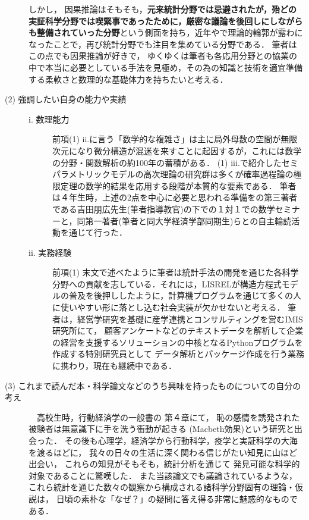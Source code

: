 \documentclass[uplatex, dvipdfmx]{jsarticle}
\begin{document}
\begin{description}
    しかし，
    因果推論はそもそも，\textbf{元来統計分野では忌避されたが，殆どの実証科学分野では喫緊事であったために，厳密な議論を後回しにしながらも整備されていった分野}という側面を持ち，近年\cite{Rubin74-Causal}や\cite{Pearl95-CausalDiagram}で理論的輪郭が露わになったことで，再び統計分野でも注目を集めている分野である．
    筆者はこの点でも因果推論が好きで，
    ゆくゆくは筆者も各応用分野との協業の中で本当に必要としている手法を見極め，その為の知識と技術を適宜準備する柔軟さと数理的な基礎体力を持ちたいと考える．
    \vspace{1em}\clearpage
    \item[(2) 強調したい自身の能力や実績] \mbox{}\vspace{1em}
    \begin{description}
        \item[i. 数理能力] 前項(1) ii.に言う「数学的な複雑さ」は主に局外母数の空間が無限次元になり微分構造が混迷を来すことに起因するが，これには数学の分野・関数解析の約100年の蓄積がある．
        (1) iii.で紹介したセミパラメトリックモデルの高次理論の研究群は多くが確率過程論の極限定理の数学的結果を応用する段階が本質的な要素である．
        筆者は４年生時，上述の2点を中心に必要と思われる準備を\cite{YechanPark-Zhan-Yoshida22}の第三著者である吉田朋広先生(筆者指導教官)の下での１対１での数学セミナーと，同第一著者(筆者と同大学経済学部同期生)らとの自主輪読活動を通じて行った．
        \vspace{1em}\item[ii. 実務経験] 前項(1) 末文で述べたように筆者は統計手法の開発を通じた各科学分野への貢献を志している．それには，LISRELが構造方程式モデルの普及を後押ししたように，計算機プログラムを通じて多くの人に使いやすい形に落とし込む社会実装が欠かせないと考える．
        筆者は，経営学研究を基礎に産学連携とコンサルティングを営むIMIS研究所にて，
        顧客アンケートなどのテキストデータを解析して企業の経営を支援するソリューションの中核となるPythonプログラムを作成する特別研究員として
        データ解析とパッケージ作成を行う業務に携わり，現在も継続中である．
    \end{description}
    \item[(3) これまで読んだ本・科学論文などのうち興味を持ったものについての自分の考え] 
    \mbox{}
    \vspace{1em}
    
    　高校生時，行動経済学の一般書\cite{DanielKahneman13-FastAndSlow}の
    第４章にて，
    恥の感情を誘発された被験者は無意識下に手を洗う衝動が起きる\cite{06-LadyMacbeth} (Macbeth効果)という研究と出会った．
    その後も心理学，経済学から行動科学，疫学と実証科学の大海を渡るほどに，
    我々の日々の生活に深く関わる信じがたい知見に山ほど出会い，
    これらの知見がそもそも，統計分析を通じて
    発見可能な科学的対象であることに驚嘆した．
    また当該論文でも議論されているような，
    これら統計を通じた数々の観察から構成される諸科学分野固有の理論・仮説は，
    日頃の素朴な「なぜ？」の疑問に答え得る非常に魅惑的なものである．
    

\end{description}
\end{document}
